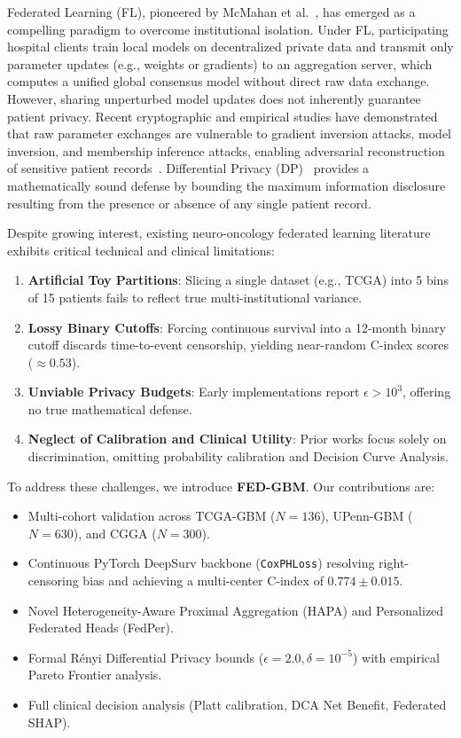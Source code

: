 \documentclass[journal,10pt,twocolumn]{IEEEtran}
\begin{document}
Federated Learning (FL), pioneered by McMahan et al.~\cite{mcmahan2017communication}, has emerged as a compelling paradigm to overcome institutional isolation. Under FL, participating hospital clients train local models on decentralized private data and transmit only parameter updates (e.g., weights or gradients) to an aggregation server, which computes a unified global consensus model without direct raw data exchange. However, sharing unperturbed model updates does not inherently guarantee patient privacy. Recent cryptographic and empirical studies have demonstrated that raw parameter exchanges are vulnerable to gradient inversion attacks, model inversion, and membership inference attacks, enabling adversarial reconstruction of sensitive patient records~\cite{zhu2019deep}. Differential Privacy (DP)~\cite{dwork2014algorithmic} provides a mathematically sound defense by bounding the maximum information disclosure resulting from the presence or absence of any single patient record.

Despite growing interest, existing neuro-oncology federated learning literature exhibits critical technical and clinical limitations:
\begin{enumerate}
    \item \textbf{Artificial Toy Partitions}: Slicing a single dataset (e.g., TCGA) into 5 bins of 15 patients fails to reflect true multi-institutional variance.
    \item \textbf{Lossy Binary Cutoffs}: Forcing continuous survival into a 12-month binary cutoff discards time-to-event censorship, yielding near-random C-index scores ($\approx 0.53$).
    \item \textbf{Unviable Privacy Budgets}: Early implementations report $\epsilon > 10^3$, offering no true mathematical defense.
    \item \textbf{Neglect of Calibration and Clinical Utility}: Prior works focus solely on discrimination, omitting probability calibration and Decision Curve Analysis.
\end{enumerate}

To address these challenges, we introduce \textbf{FED-GBM}. Our contributions are:
\begin{itemize}
    \item Multi-cohort validation across TCGA-GBM ($N=136$), UPenn-GBM ($N=630$), and CGGA ($N=300$).
    \item Continuous PyTorch DeepSurv backbone (\texttt{CoxPHLoss}) resolving right-censoring bias and achieving a multi-center C-index of $0.774 \pm 0.015$.
    \item Novel Heterogeneity-Aware Proximal Aggregation (HAPA) and Personalized Federated Heads (FedPer).
    \item Formal R\'enyi Differential Privacy bounds ($\epsilon = 2.0, \delta = 10^{-5}$) with empirical Pareto Frontier analysis.
    \item Full clinical decision analysis (Platt calibration, DCA Net Benefit, Federated SHAP).
\end{itemize}
\end{document}
